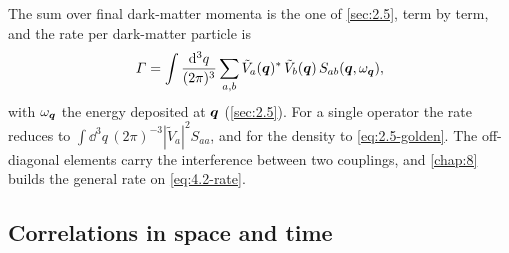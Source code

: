 The sum over final dark-matter momenta is the one of \cref{sec:2.5}, term by term, and the rate per dark-matter particle is
\begin{equation}
  \varGamma = \int\frac{\mathrm{d}^3q}{(2\pi)^3}\sum_{a,b}\tilde V_a(\bm{q})^*\,\tilde V_b(\bm{q})\,S_{ab}(\bm{q},\omega_{\bm{q}}) ,
  \label{eq:4.2-rate}
\end{equation}
with $\omega_{\bm{q}}$ the energy deposited at $\bm{q}$ (\cref{sec:2.5}). For a single operator the rate reduces to $\int\dd^3q\,(2\pi)^{-3}|\tilde V_a|^2S_{aa}$, and for the density to \cref{eq:2.5-golden}. The off-diagonal elements carry the interference between two couplings, and \cref{chap:8} builds the general rate on \cref{eq:4.2-rate}.

\subsection{Correlations in space and time}


